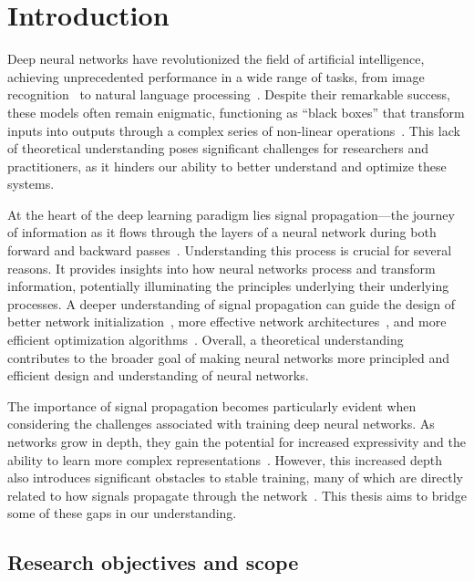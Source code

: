 
\chapter{Introduction}\label{ch:intro}

Deep neural networks have revolutionized the field of artificial intelligence, achieving unprecedented performance in a wide range of tasks, from image recognition~\cite{krizhevsky2012imagenet} to natural language processing~\cite{devlin2018bert}. Despite their remarkable success, these models often remain enigmatic, functioning as ``black boxes'' that transform inputs into outputs through a complex series of non-linear operations~\cite{alain2016understanding}. This lack of theoretical understanding poses significant challenges for researchers and practitioners, as it hinders our ability to better understand and optimize these systems.

At the heart of the deep learning paradigm lies signal propagation—the journey of information as it flows through the layers of a neural network during both forward and backward passes~\cite{glorot2010understanding}. Understanding this process is crucial for several reasons. It provides insights into how neural networks process and transform information, potentially illuminating the principles underlying their underlying processes. A deeper understanding of signal propagation can guide the design of better network initialization~\cite{glorot2010understanding}, more effective network architectures~\cite{he2016deep}, and more efficient optimization algorithms~\cite{kingma2014adam}. Overall, a theoretical understanding contributes to the broader goal of making neural networks more principled and efficient design and understanding of neural networks.

The importance of signal propagation becomes particularly evident when considering the challenges associated with training deep neural networks. As networks grow in depth, they gain the potential for increased expressivity and the ability to learn more complex representations~\cite{bengio1994learning}. However, this increased depth also introduces significant obstacles to stable training, many of which are directly related to how signals propagate through the network~\cite{glorot2010understanding, he2015delving}. This thesis aims to bridge some of these gaps in our understanding. 

\section{Research objectives and scope}

